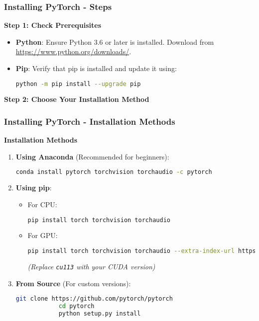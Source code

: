 \documentclass[aspectratio=169]{beamer}
\begin{document}
\begin{frame}[fragile]
    \frametitle{Installing PyTorch - Steps}
    \textbf{Step 1: Check Prerequisites}
    
    \begin{itemize}
        \item \textbf{Python}: Ensure Python 3.6 or later is installed. Download from \url{https://www.python.org/downloads/}.
        \item \textbf{Pip}: Verify that pip is installed and update it using:
        \begin{lstlisting}[language=bash]
            python -m pip install --upgrade pip
        \end{lstlisting}
    \end{itemize}
    
    \textbf{Step 2: Choose Your Installation Method}
\end{frame}

\begin{frame}[fragile]
    \frametitle{Installing PyTorch - Installation Methods}
    \textbf{Installation Methods}
    
    \begin{enumerate}
        \item \textbf{Using Anaconda} (Recommended for beginners):
        \begin{lstlisting}[language=bash]
            conda install pytorch torchvision torchaudio -c pytorch
        \end{lstlisting}
        
        \item \textbf{Using pip}:
        \begin{itemize}
            \item For CPU:
            \begin{lstlisting}[language=bash]
                pip install torch torchvision torchaudio
            \end{lstlisting}
            \item For GPU:
            \begin{lstlisting}[language=bash]
                pip install torch torchvision torchaudio --extra-index-url https://download.pytorch.org/whl/cu113
            \end{lstlisting}
            \textit{(Replace \texttt{cu113} with your CUDA version)}
        \end{itemize}
        
        \item \textbf{From Source} (For custom versions):
        \begin{lstlisting}[language=bash]
            git clone https://github.com/pytorch/pytorch
            cd pytorch
            python setup.py install
        \end{lstlisting}
    \end{enumerate}
\end{frame}
\end{document}
